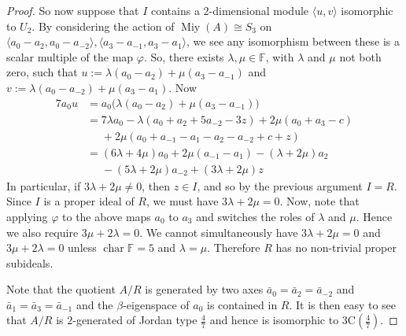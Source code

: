 \documentclass[11pt, a4paper]{article}
\theoremstyle{plain}
\theoremstyle{definition}
\newcommand\bt{\beta}
\newcommand\lm{\lambda}
\newcommand\la{\langle}
\newcommand\ra{\rangle}
\DeclareMathOperator{\ch}{char}
\newcommand\FF{\mathbb{F}}
\newcommand{\C}{\mathrm{C}}
\DeclareMathOperator{\Miy}{Miy}
\newcommand{\0}{\overline{0}}
\newcommand{\2}{\overline{2}}
\renewcommand{\phi}{\varphi}
\newcommand{\1}{\mathbbm{1}}
\begin{document}
\begin{proof}
So now suppose that $I$ contains a $2$-dimensional module $\la u , v \ra$ isomorphic to $U_2$.  By considering the action of $\Miy(A) \cong S_3$ on $\langle a_0 - a_2, a_0 - a_{-2} \rangle, \langle a_3 - a_{-1}, a_3 - a_1 \rangle$, we see any isomorphism between these is a scalar multiple of the map $\phi$.  So, there exists $\lm, \mu \in \mathbb{F}$, with $\lm$ and $\mu$ not both zero, such that $u := \lambda(a_0 - a_2) + \mu(a_3 - a_{-1})$ and $v :=  \lambda(a_0 - a_{-2}) + \mu(a_3 - a_1)$.  Now
\begin{align*}
7a_0 u &= a_0 \big( \lambda(a_0 - a_2) + \mu(a_3 - a_{-1}) \big) \\
&=  7\lambda a_0 - \lambda \left(a_0 + a_2 + 5a_{-2} - 3z \right) + 2\mu \left(a_0 + a_3 - c\right) \\
&\phantom{{}={}} + 2\mu \left(a_0 + a_{-1} - a_1 - a_2 - a_{-2} + c + z\right) \\
&= (6\lm + 4 \mu)a_0 +2\mu (a_{-1} - a_1) - (\lm + 2\mu) a_2 \\ 
&\phantom{{}={}} - (5\lm + 2\mu) a_{-2} + (3\lm + 2\mu) z
\end{align*}
In particular, if $3\lambda + 2\mu \neq 0$, then $z \in I$, and so by the previous argument $I = R$.  Since $I$ is a proper ideal of $R$, we must have $3\lambda + 2\mu = 0$.
Now, note that applying $\phi$ to the above maps $a_0$ to $a_3$ and switches the roles of $\lambda$ and $\mu$.  Hence we also require $3\mu + 2\lm = 0$.  We cannot simultaneously have $3\lm + 2\mu = 0$ and $3\mu + 2\lm = 0$ unless $\ch \FF = 5$ and $\lm = \mu$.  Therefore $R$ has no non-trivial proper subideals.

Note that the quotient $A/R$ is generated by two axes $\bar{a}_0 = \bar{a}_2 = \bar{a}_{-2}$ and $\bar{a}_1 = \bar{a}_3 = \bar{a}_{-1}$ and the $\bt$-eigenspace of $a_0$ is contained in $R$.  It is then easy to see that $A/R$ is $2$-generated of Jordan type $\frac{4}{7}$ and hence is isomorphic to $3\C(\frac{4}{7})$.
\end{proof}
\end{document}
